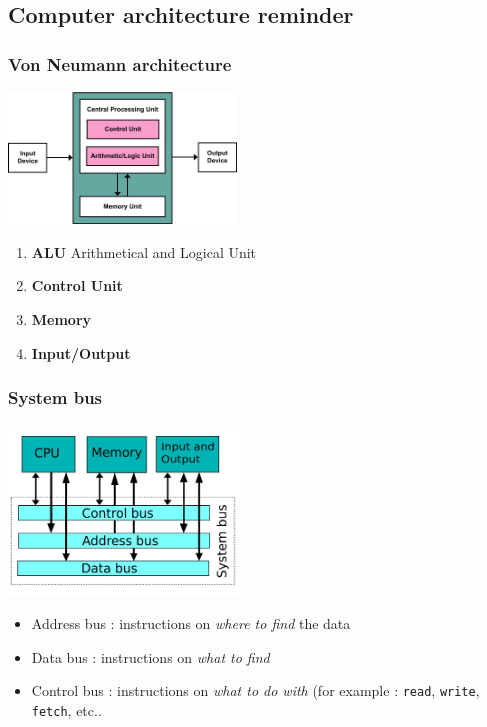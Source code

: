 %
%
\subsection{Computer architecture reminder}


\begin{frame}[containsverbatim]
\frametitle{Von Neumann architecture}
\begin{center}
        {\includegraphics[height=3.5cm]{Day0/images/vonneumann.png}}
\end{center}
\begin{enumerate}
	\item{\textbf{ALU} Arithmetical and Logical Unit}
	\item{\textbf{Control Unit}}
	\item{\textbf{Memory}}
	\item{\textbf{Input/Output}}
\end{enumerate}
\end{frame}

\begin{frame}[containsverbatim]
\frametitle{System bus}
\begin{center}
        {\includegraphics[height=4.5cm]{Day0/images/system-bus.png}}
\end{center}
\begin{itemize}
	\item{Address bus : instructions on \textit{where to find} the data}
	\item{Data bus : instructions on \textit{what to find}}
	\item{Control bus : instructions on \textit{what to do with} (for example : \texttt{read}, \texttt{write}, \texttt{fetch}, etc..}
\end{itemize}
\end{frame}

